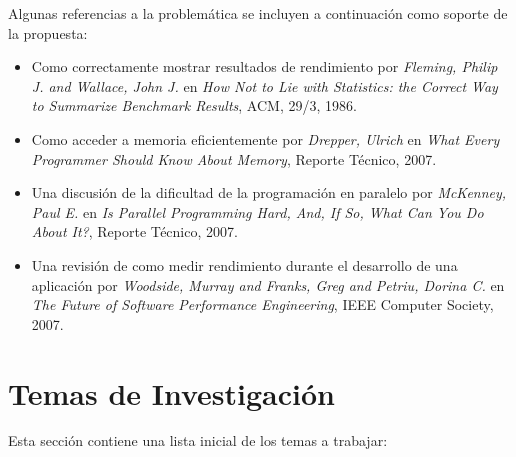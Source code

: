 \documentclass[a4paper]{article}
\begin{document}
\bigskip

Algunas referencias a la problemática se incluyen a continuación como soporte de la propuesta:

\begin{itemize}

\item Como correctamente mostrar resultados de rendimiento por {\it Fleming, Philip J. and Wallace, John J.} en {\it How Not to Lie with Statistics: the Correct Way to Summarize Benchmark Results}, {ACM}, {29/3}, {1986}.

\item Como acceder a memoria eficientemente por {\it Drepper, Ulrich} en {\it What Every Programmer Should Know About Memory}, Reporte Técnico, 2007.

\item Una discusión de la dificultad de la programación en paralelo por {\it McKenney, Paul E.} en {\it Is Parallel Programming Hard, And, If So, What Can You Do About It?}, Reporte Técnico, 2007.

\item Una revisión de como medir rendimiento durante el desarrollo de una aplicación por {\it Woodside, Murray and Franks, Greg and Petriu, Dorina C.} en {\it The Future of Software Performance Engineering}, IEEE Computer Society, 2007.

\end{itemize}

\section{Temas de Investigación}

Esta sección contiene una lista inicial de los temas a trabajar:
\end{document}
